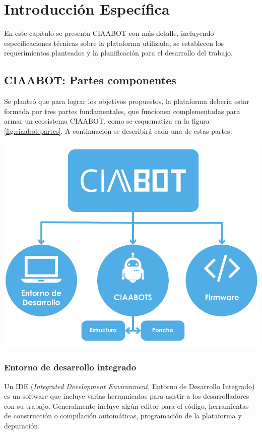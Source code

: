 \chapter{Introducción Específica} %

\label{Chapter2}
En este capítulo se presenta CIAABOT con más detalle, incluyendo especificaciones técnicas sobre la plataforma utilizada, se establecen los requerimientos planteados y la planificación para el desarrollo del trabajo.

\section{CIAABOT: Partes componentes}
\label{sec:ciaabot:partes}
Se planteó que para lograr los objetivos propuestos, la plataforma debería estar formada por tres partes fundamentales, que funcionen complementadas para armar un ecosistema CIAABOT, como se esquematiza en la figura \ref{fig:ciaabot:partes}. A continuación se describirá cada una de estas partes.

\begin{center}
    \includegraphics[scale=.8]{./Figures/ciaabot-partes.pdf}
    \label{fig:ciaabot:partes}
\end{center}


\subsection{Entorno de desarrollo integrado}
\label{subsec:ide}
Un IDE (\emph{Integrated Development Environment}, Entorno de Desarrollo Integrado) es un software que incluye varias herramientas para asistir a los desarrolladores con su trabajo. Generalmente incluye algún editor para el código, herramientas de construcción o compilación automáticas, programación de la plataforma y depuración.

